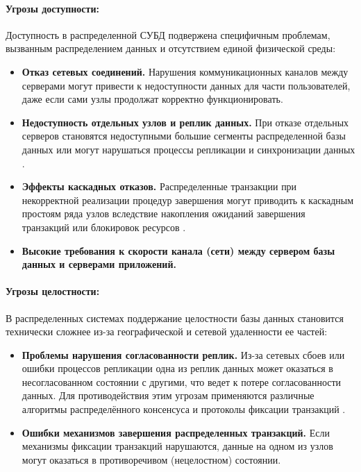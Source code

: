 \paragraph{Угрозы доступности:}

Доступность в распределенной СУБД подвержена специфичным проблемам, вызванным распределением данных и отсутствием единой физической среды:

\begin{itemize} 
    \item \textbf{Отказ сетевых соединений.} Нарушения коммуникационных каналов между серверами могут привести к недоступности данных для части пользователей, даже если сами узлы продолжат корректно функционировать\autocite{Karpova2009}.
    \item \textbf{Недоступность отдельных узлов и реплик данных.} При отказе отдельных серверов становятся недоступными большие сегменты распределенной базы данных или могут нарушаться процессы репликации и синхронизации данных \autocite[гл. Отказоустойчивость]{Tanenbaum}. 
    \item \textbf{Эффекты каскадных отказов.} Распределенные транзакции при некорректной реализации процедур завершения могут приводить к каскадным простоям ряда узлов вследствие накопления ожиданий завершения транзакций или блокировок ресурсов \autocite{IntroBD2014}. 
    \item \textbf{Высокие требования к скорости канала (сети) между сервером базы данных и серверами приложений.}
\end{itemize}

\paragraph{Угрозы целостности:}

В распределенных системах поддержание целостности базы данных становится технически сложнее из-за географической и сетевой удаленности ее частей:

\begin{itemize} 
    \item \textbf{Проблемы нарушения согласованности реплик.} Из-за сетевых сбоев или ошибки процессов репликации одна из реплик данных может оказаться в несогласованном состоянии с другими, что ведет к потере согласованности данных. Для противодействия этим угрозам применяются различные алгоритмы распределённого консенсуса и 
    протоколы фиксации транзакций \autocite[гл. Непротиворечивость и репликация]{Tanenbaum}.
    \item \textbf{Ошибки механизмов завершения распределенных транзакций.} Если механизмы фиксации транзакций нарушаются, данные на одном из узлов могут оказаться в противоречивом (нецелостном) состоянии. 
\end{itemize}

